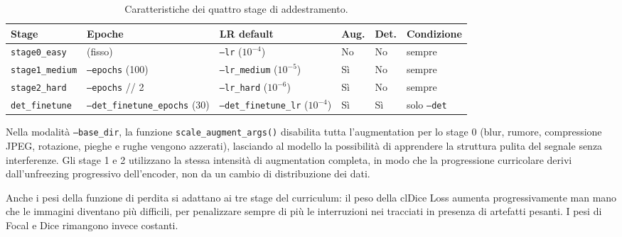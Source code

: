 
\begin{table}[H]
\centering
\small
\caption{Caratteristiche dei quattro stage di addestramento.}
\label{tab:extractor_stages}
\setlength{\tabcolsep}{4pt} 
\begin{tabularx}{\textwidth}{
    l
    >{\RaggedRight\hsize=1.1\hsize}X
    >{\RaggedRight\hsize=0.9\hsize}X
    l
    l
    l
}
\toprule
\textbf{Stage} & \textbf{Epoche} & \textbf{LR default} & \textbf{Aug.} & \textbf{Det.} & \textbf{Condizione} \\
\midrule
\texttt{stage0\_easy}   & 20 (fisso) & \texttt{--lr} ($10^{-4}$) & No & No & sempre \\
\addlinespace[0.5em]
\texttt{stage1\_medium} & \texttt{--epochs} (100) & \texttt{--lr\_medium} ($10^{-5}$) & Sì & No & sempre \\
\addlinespace[0.5em]
\texttt{stage2\_hard}   & \texttt{--epochs} // 2 & \texttt{--lr\_hard} ($10^{-6}$) & Sì & No & sempre \\
\addlinespace[0.5em]
\texttt{det\_finetune}  & \texttt{--det\_finetune\_\allowbreak{}epochs} (30) & \texttt{--det\_finetune\_lr} ($10^{-4}$) & Sì & Sì & solo \texttt{--det} \\
\bottomrule
\end{tabularx}
\end{table}

Nella modalità \texttt{--base\_dir}, la funzione \texttt{scale\_augment\_args()} disabilita tutta l'augmentation per lo stage 0 (blur, rumore, compressione JPEG, rotazione, pieghe e rughe vengono azzerati), lasciando al modello la possibilità di apprendere la struttura pulita del segnale senza interferenze. Gli stage 1 e 2 utilizzano la stessa intensità di augmentation completa, in modo che la progressione curricolare derivi dall'unfreezing progressivo dell'encoder, non da un cambio di distribuzione dei dati.

Anche i pesi della funzione di perdita si adattano ai tre stage del curriculum: il peso della clDice Loss aumenta progressivamente man mano che le immagini diventano più difficili, per penalizzare sempre di più le interruzioni nei tracciati in presenza di artefatti pesanti. I pesi di Focal e Dice rimangono invece costanti.

